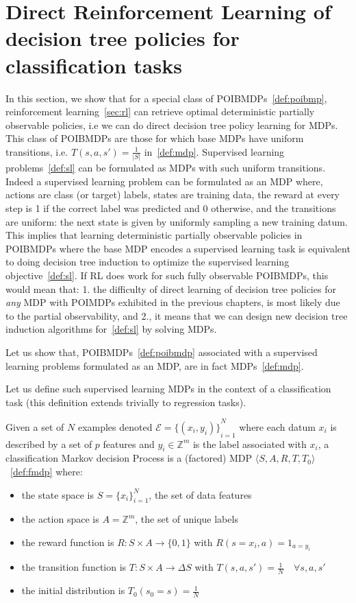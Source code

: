 \chapter{Direct Reinforcement Learning of decision tree policies for classification tasks}\label{sec:pomdp-classif}
In this section, we show that for a special class of POIBMDPs~\ref{def:poibmp}, reinforcement learning~\ref{sec:rl} can retrieve optimal deterministic partially observable policies, i.e we can do direct decision tree policy learning for MDPs.
This class of POIBMDPs are those for which base MDPs have uniform transitions, i.e. $T(s, a, s') = \frac{1}{|S|}$ in~\ref{def:mdp}.
Supervised learning problems~\ref{def:sl} can be formulated as MDPs with such uniform transitions.
Indeed a supervised learning problem can be formulated as an MDP where, actions are class (or target) labels, states are training data, the reward at every step is 1 if the correct label was predicted and 0 otherwise, and the transitions are uniform: the next state is given by uniformly sampling a new training datum. 
This implies that learning deterministic partially observable policies in POIBMDPs where the base MDP encodes a supervised learning task is equivalent to doing decision tree induction to optimize the supervised learning objective~\ref{def:sl}.
If RL does work for such fully observable POIBMDPs, this would mean that: 1. the difficulty of direct learning of decision tree policies for \textit{any} MDP with POIMDPs exhibited in the previous chapters, is most likely due to the partial observability, and 2., it means that we can design new decision tree induction algorithms for~\ref{def:sl} by solving MDPs.

Let us show that, POIBMDPs~\ref{def:poibmdp} associated with a supervised learning problems formulated as an MDP, are in fact MDPs~\ref{def:mdp}.

Let us define such supervised learning MDPs in the context of a classification task (this definition extends trivially to regression tasks).
\begin{definition}\label{def:cmdp}
    Given a set of $N$ examples denoted $\mathcal{E} = {\{(x_i, y_i)\}}_{i=1}^N$ where each datum $x_i$ is described by a set of $p$ features and $y_i \in \mathbb{Z}^m$ is the label associated with $x_i$, a classification Markov decision Process is a (factored) MDP $\langle S, A, R, T, T_0 \rangle$~\ref{def:fmdp} where:
    \begin{itemize}
        \item the state space is $S={\{x_i\}}_{i=1}^N$, the set of data features
        \item the action space is $A=\mathbb{Z}^m$, the set of unique labels
        \item the reward function is $R:S\times A \rightarrow \{0, 1\}$ with $R(s=x_i, a) = 1_{a=y_i}$
        \item the transition function is $T:S\times A \rightarrow \Delta S$ with $T(s, a, s') = \frac{1}{N} \quad \forall s, a, s'$
        \item the initial distribution is $T_0(s_0 = s) = \frac{1}{N}$
    \end{itemize}
\end{definition}

